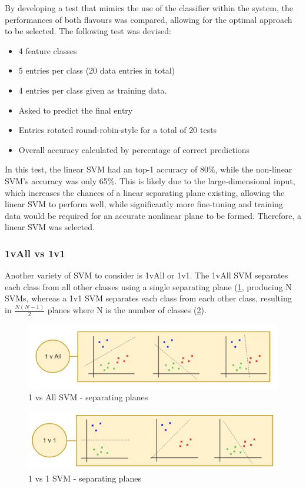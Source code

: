By developing a test that mimics the use of the classifier within the system, the performances of both flavours was compared, allowing for the optimal approach to be selected. The following test was devised:
\begin{itemize}
\item 4 feature classes
\item 5 entries per class (20 data entries in total)
\item 4 entries per class given as training data.
\item Asked to predict the final entry
\item Entries rotated round-robin-style for a total of 20 tests
\item Overall accuracy calculated by percentage of correct predictions
\end{itemize}
In this test, the linear SVM had an top-1 accuracy of 80\%, while the non-linear SVM’s accuracy was only 65\%. This is likely due to the large-dimensional input, which increases the chances of a linear separating plane existing, allowing the linear SVM to perform well, while significantly more fine-tuning and training data would be required for an accurate nonlinear plane to be formed. Therefore, a linear SVM was selected.

\subsubsection{1vAll vs 1v1}
Another variety of SVM to consider is 1vAll or 1v1. The 1vAll SVM separates each class from all other classes using a single separating plane (\ref{fig:1vAll}, producing N SVMs, whereas a 1v1 SVM separates each class from each other class, resulting in $\frac{N(N-1)}{2}$ planes where N is the number of classes (\ref{fig:1v1}). 
\begin{figure}[H]
    \centering
    \includegraphics{figs/8/1vall_svm}
    \caption{1 vs All SVM - separating planes}
    \label{fig:1vAll}
\end{figure}
\begin{figure}
    \centering
    \includegraphics{figs/8/1v1_svm}
    \caption{1 vs 1 SVM - separating planes}
    \label{fig:1v1}
\end{figure}

